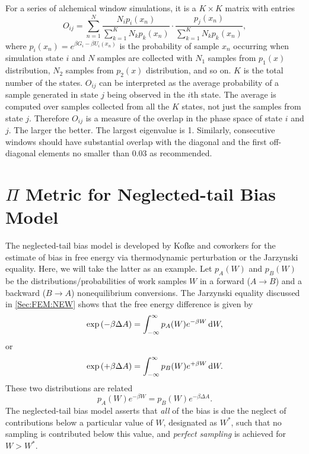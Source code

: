 For a series of alchemical window simulations, it is a $K \times K$ matrix with entries
\begin{equation}
O_{ij}=\sum\limits_{n=1}^{N}\frac{N_{i}p_{i}(x_{n})}{\sum\limits_{k=1}^{K}N_{k}p_{k}(x_{n})}\cdot \frac{p_{j}(x_{n})}{\sum\limits_{k=1}^{K}N_{k}p_{k}(x_{n})},
\end{equation}
where $p_{i}(x_{n})=e^{\beta G_{i}-\beta U_{i}(x_{n})}$ is the probability of sample $x_{n}$ occurring when simulation state $i$ and $N$ samples are collected with $N_{1}$ samples from $p_{1}(x)$ distribution, $N_{2}$ samples from $p_{2}(x)$ distribution, and so on. $K$ is the total number of the states. $O_{ij}$ can be interpreted as the average probability of a sample generated in state $j$ being observed in the $i$th state. The average is computed over samples collected from all the $K$ states, not just the samples from state $j$. Therefore $O_{ij}$ is a measure of the overlap in the phase space of state $i$ and $j$. The larger the better. The largest eigenvalue is 1.
Similarly, consecutive windows should have substantial overlap with the diagonal and the first off-diagonal elements no smaller than 0.03 as recommended\cite{KlimovichJCAMD2015}. 

\section{\texorpdfstring{$\Pi$ Metric for Neglected-tail Bias Model}{Π Metric for Neglected-tail Bias Model}\label{Sec:Eva:Pi}}
The neglected-tail bias model is developed by Kofke and coworkers for the estimate of bias in free energy via thermodynamic perturbation or the Jarzynski equality\cite{LuJCP2001,WuJCP2004}. Here, we will take the latter as an example. Let $p_A(W)$ and $p_B(W)$ be the distributions/probabilities of work samples $W$ in a forward ($A\to B$) and a backward ($B\to A$) nonequilibrium conversions. The Jarzynski equality discussed in \ref{Sec:FEM:NEW} shows that the free energy difference is given by
\begin{equation}
    \exp{(-\beta \Delta A)}=\int_{-\infty}^{\infty}p_A(W)e^{-\beta W}\mathop{}\!\mathrm{d} W,
\end{equation}
or
\begin{equation}
    \exp{(+\beta \Delta A)}=\int_{-\infty}^{\infty}p_B(W)e^{+\beta W}\mathop{}\!\mathrm{d} W.
\end{equation}
These two distributions are related
\begin{equation}
    p_A(W)e^{-\beta W}=p_B(W)e^{-\beta \Delta A}.
    \label{Eq:Eva:Pi:distributions_and_dA}
\end{equation}
The neglected-tail bias model asserts that \emph{all} of the bias is due the neglect of contributions below a particular value of $W$, designated as $W^\ast$, such that no sampling is contributed below this value, and \emph{perfect sampling} is achieved for $W>W^\ast$.

